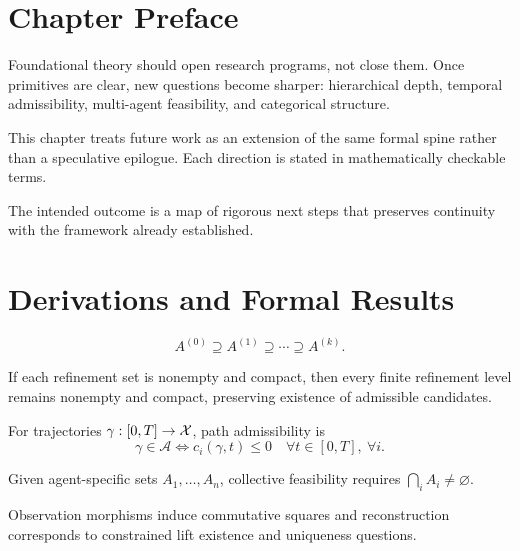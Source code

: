\section{Chapter Preface}
Foundational theory should open research programs, not close them. Once primitives are clear, new questions become sharper: hierarchical depth, temporal admissibility, multi-agent feasibility, and categorical structure.

This chapter treats future work as an extension of the same formal spine rather than a speculative epilogue. Each direction is stated in mathematically checkable terms.

The intended outcome is a map of rigorous next steps that preserves continuity with the framework already established.

\section{Derivations and Formal Results}

\begin{definition}
\[
A^{(0)}\supseteq A^{(1)}\supseteq\cdots\supseteq A^{(k)}.
\]
\end{definition}

\begin{proposition}
If each refinement set is nonempty and compact, then every finite refinement level remains nonempty and compact, preserving existence of admissible candidates.
\end{proposition}

\begin{definition}
For trajectories \(\gamma:[0,T]\to\mathcal{X}\), path admissibility is
\[
\gamma\in\mathcal A\iff c_i(\gamma,t)\le0\quad\forall t\in[0,T],\ \forall i.
\]
\end{definition}

\begin{definition}
Given agent-specific sets \(A_1,\ldots,A_n\), collective feasibility requires \(\bigcap_iA_i\neq\varnothing\).
\end{definition}

\begin{proposition}
Observation morphisms induce commutative squares and reconstruction corresponds to constrained lift existence and uniqueness questions.
\end{proposition}
